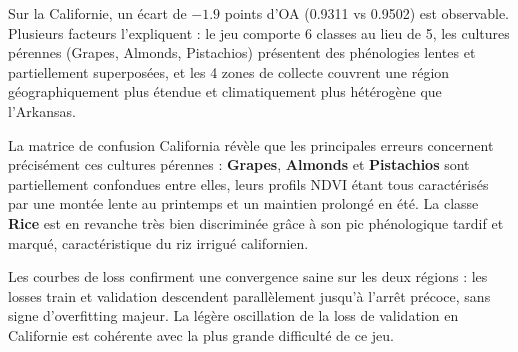 Sur la Californie, un écart de $-1.9$ points d'OA (0.9311 vs 0.9502)
est observable. Plusieurs facteurs l'expliquent : le jeu comporte 6 classes
au lieu de 5, les cultures pérennes (Grapes, Almonds, Pistachios) présentent
des phénologies lentes et partiellement superposées, et les 4 zones de
collecte couvrent une région géographiquement plus étendue et climatiquement
plus hétérogène que l'Arkansas.

La matrice de confusion California révèle que les principales erreurs
concernent précisément ces cultures pérennes : \textbf{Grapes},
\textbf{Almonds} et \textbf{Pistachios} sont partiellement confondues entre
elles, leurs profils NDVI étant tous caractérisés par une montée lente au
printemps et un maintien prolongé en été. La classe \textbf{Rice} est en
revanche très bien discriminée grâce à son pic phénologique tardif et marqué,
caractéristique du riz irrigué californien.

Les courbes de loss confirment une convergence saine sur les deux régions :
les losses train et validation descendent parallèlement jusqu'à l'arrêt
précoce, sans signe d'overfitting majeur. La légère oscillation de la loss
de validation en Californie est cohérente avec la plus grande difficulté de
ce jeu.

\cleardoublepage
